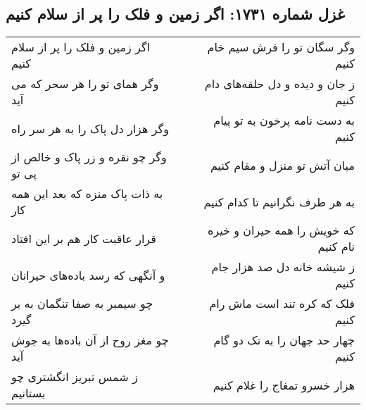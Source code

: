 \begin{center}
\section*{غزل شماره ۱۷۳۱: اگر زمین و فلک را پر از سلام کنیم}
\label{sec:1731}
\begin{longtable}{l p{0.5cm} r}
اگر زمین و فلک را پر از سلام کنیم
&&
وگر سگان تو را فرش سیم خام کنیم
\\
وگر همای تو را هر سحر که می آید
&&
ز جان و دیده و دل حلقه‌های دام کنیم
\\
وگر هزار دل پاک را به هر سر راه
&&
به دست نامه پرخون به تو پیام کنیم
\\
وگر چو نقره و زر پاک و خالص از پی تو
&&
میان آتش تو منزل و مقام کنیم
\\
به ذات پاک منزه که بعد این همه کار
&&
به هر طرف نگرانیم تا کدام کنیم
\\
قرار عاقبت کار هم بر این افتاد
&&
که خویش را همه حیران و خیره نام کنیم
\\
و آنگهی که رسد باده‌های حیرانان
&&
ز شیشه خانه دل صد هزار جام کنیم
\\
چو سیمبر به صفا تنگمان به بر گیرد
&&
فلک که کره تند است ماش رام کنیم
\\
چو مغز روح از آن باده‌ها به جوش آید
&&
چهار حد جهان را به تک دو گام کنیم
\\
ز شمس تبریز انگشتری چو بستانیم
&&
هزار خسرو تمغاج را غلام کنیم
\\
\end{longtable}
\end{center}
